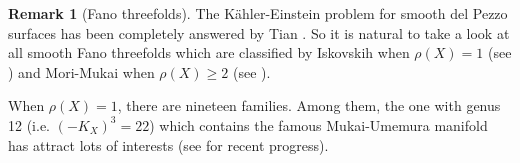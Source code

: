 \documentclass[12pt,reqno]{amsart}%
\theoremstyle{definition}
\newtheorem{rem}[thm]{Remark}
\theoremstyle{remark}
\begin{document}
\begin{rem}[Fano threefolds]\label{e-dim3} 
The K\"ahler-Einstein problem for smooth del Pezzo surfaces has been completely answered by Tian \cite{Tia90}. So it is natural to take a look at all smooth Fano threefolds which are classified by Iskovskih when $\rho(X)=1$ (see \cite{Isk78}) and Mori-Mukai when $\rho(X)\ge 2$ (see \cite{MM81}).


 
 When $\rho(X)=1$, there are nineteen families. Among them,  the one with genus 12 (i.e. $(-K_X)^3=22$) which contains the famous Mukai-Umemura manifold has attract lots of interests (see \cite{CS18} for recent progress).






\end{rem}
\end{document}
